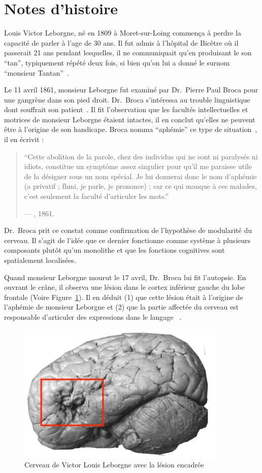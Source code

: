 \section{Notes d'histoire}

Louis Victor Leborgne, né en 1809 à Moret-sur-Loing commença à perdre la capacité de parler à l'age de 30 ans.
Il fut admis à l'hôpital de Bicêtre où il passerait 21 ans pendant lesquelles, 
il ne communiquait qu'en produisant le son ``tan'', typiquement répété deux fois, 
si bien qu'on lui a donné le surnom ``monsieur Tantan''~\cite{Mohammed_Narayan_Patra_Nanda_2018}.

Le 11 avril 1861, monsieur Leborgne fut examiné par Dr.~Pierre Paul Broca pour une gangrène dans son pied droit.
Dr.~Broca s'intéressa au trouble linguistique dont souffrait son patient~\cite{Lorch_2011}.
Il fit l'observation que les facultés intellectuelles et motrices de monsieur Leborgne étaient intactes,
il en conclut qu'elles ne peuvent être à l'origine de son handicape. 
Broca nomma ``aphémie'' ce type de situation~\cite{Broca}, il en écrivit :

\begin{quotation}
    ``Cette abolition de la parole, chez des individus qui ne sont ni paralysés ni idiots, constitue un symptôme assez singulier pour qu'il me paraisse utile de la désigner sous un nom spécial. Je lui donnerai donc le nom d'aphémie (\textgreek{a} privatif ; \textgreek{fhmi}, je parle, je prononce) ; car ce qui manque à ces malades, c'est seulement la faculté d'articuler les mots.''
    \begin{flushright}
        \rm --- \citeauthor{Broca}, 1861.
    \end{flushright}
\end{quotation}

Dr.~Broca prit ce constat comme confirmation de l'hypothèse de modularité du cerveau.
Il s'agit de l'idée que ce dernier fonctionne comme système à plusieurs composants plutôt qu'un monolithe
et que les fonctions cognitives sont spatialement localisées.

Quand monsieur Leborgne mourut le 17 avril, Dr.~Broca lui fit l'autopsie.
En ouvrant le crâne, il observa une lésion dans le cortex inférieur gauche du lobe frontale 
(Voire Figure~\ref{fig:leborgne-brain}).
Il en déduit (1) que cette lésion était à l'origine de l'aphémie de monsieur Leborgne et 
(2) que la partie affectée du cerveau est responsable d'articuler des expressions dans le langage
~\cite{Broca,Lorch_2011,Mohammed_Narayan_Patra_Nanda_2018}.

\begin{figure}[htb]
    \begin{center}
        \includegraphics[width=10cm]{assets/images/leborgne-brain.png}
    \end{center}
    \caption{Cerveau de Victor Louis Leborgne avec la lésion encadrée}
    \label{fig:leborgne-brain}
\end{figure}